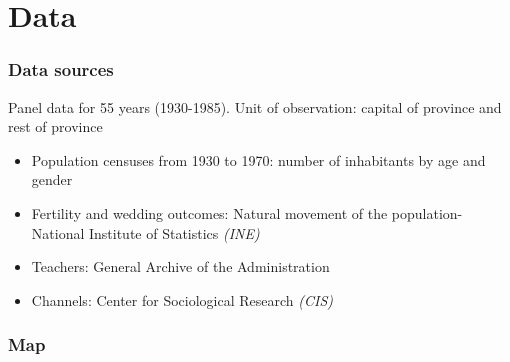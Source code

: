 \documentclass{beamer}
\begin{document}
\section{Data}
\begin{frame}
\frametitle{Data sources}
 
Panel data for 55 years (1930-1985). Unit of observation: capital of province and rest of province
\begin{itemize} \footnotesize
\item Population censuses from 1930 to 1970: number of inhabitants by age and gender
\item Fertility and wedding outcomes: Natural movement of the population- National  Institute of Statistics \textit{(INE)}
\item Teachers: General Archive of the Administration
\item Channels: Center for Sociological Research \textit{(CIS)}
\end{itemize}
\end{frame}
\begin{frame}
\frametitle{Map }
 
\end{frame}
\end{document}
